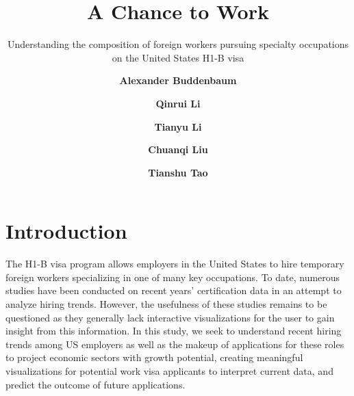 \documentclass[sigconf]{acmart}
\begin{document}
\title{A Chance to Work}
\subtitle{Understanding the composition of foreign workers 
pursuing specialty occupations on the United States H1-B visa
}


\author{\textbf{Alexander Buddenbaum}}

\author{\textbf{Qinrui Li}}

\author{\textbf{Tianyu Li}}


\author{\textbf{Chuanqi Liu}}

\author{\textbf{Tianshu Tao}}



\maketitle
\pagestyle{plain}
\section{Introduction}


The H1-B visa program allows employers in the United States to hire temporary foreign workers specializing in one of many key occupations.  
To date, numerous studies have been conducted on recent years’ certification data in an attempt to analyze hiring trends. 
However, the usefulness of these studies remains to be questioned as they generally lack interactive visualizations for the user to gain 
insight from this information. In this study, we seek to understand recent hiring trends among US employers as well as the makeup of 
applications for these roles to project economic sectors with growth potential, creating meaningful visualizations for potential work 
visa applicants to interpret current data, and predict the outcome of future applications.
\end{document}
